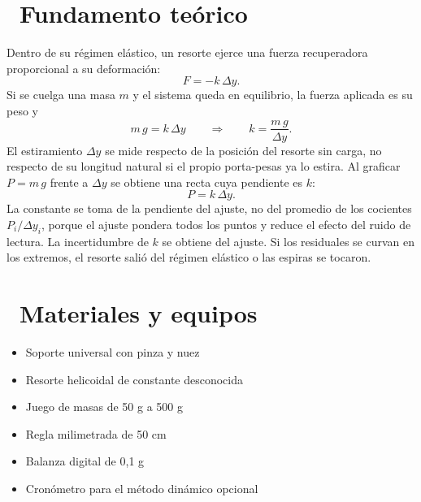 \documentclass[11pt,a4paper]{article}
\newcommand{\iconotexto}[2]{\textcolor{cyanNeon}{\faIcon{#1}}~#2}
\begin{document}
\section{\iconotexto{book-open}{Fundamento teórico}}

Dentro de su régimen elástico, un resorte ejerce una fuerza recuperadora
proporcional a su deformación:
\[
  F = -k\,\Delta y.
\]
Si se cuelga una masa $m$ y el sistema queda en equilibrio, la fuerza
aplicada es su peso y
\[
  m\,g = k\,\Delta y
  \qquad\Longrightarrow\qquad
  k = \frac{m\,g}{\Delta y}.
\]
El estiramiento $\Delta y$ se mide respecto de la posición del resorte sin
carga, no respecto de su longitud natural si el propio porta-pesas ya lo
estira. Al graficar $P = m\,g$ frente a $\Delta y$ se obtiene una recta
cuya pendiente es $k$:
\[
  P = k\,\Delta y.
\]
La constante se toma de la pendiente del ajuste, no del promedio de los
cocientes $P_i/\Delta y_i$, porque el ajuste pondera todos los puntos y
reduce el efecto del ruido de lectura. La incertidumbre de $k$ se obtiene
del ajuste. Si los residuales se curvan en los extremos, el resorte salió
del régimen elástico o las espiras se tocaron.

\begin{center}
\par{}
\end{center}

\section{\iconotexto{box-open}{Materiales y equipos}}

\begin{itemize}[leftmargin=1.4em,itemsep=2pt,topsep=3pt]
  \item Soporte universal con pinza y nuez
  \item Resorte helicoidal de constante desconocida
  \item Juego de masas de 50 g a 500 g
  \item Regla milimetrada de 50 cm
  \item Balanza digital de 0,1 g
  \item Cronómetro para el método dinámico opcional
\end{itemize}
\end{document}
